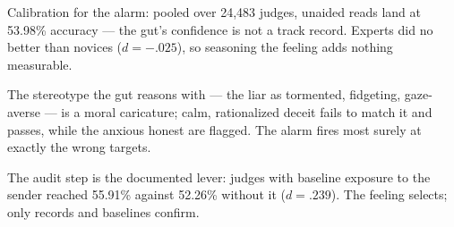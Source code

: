

\begin{distilled}
  \item Calibration for the alarm: pooled over 24,483 judges, unaided reads land at 53.98\% accuracy --- the gut's confidence is not a track record. Experts did no better than novices ($d = -.025$), so seasoning the feeling adds nothing measurable.
  \item The stereotype the gut reasons with --- the liar as tormented, fidgeting, gaze-averse --- is a moral caricature; calm, rationalized deceit fails to match it and passes, while the anxious honest are flagged. The alarm fires most surely at exactly the wrong targets.
  \item The audit step is the documented lever: judges with baseline exposure to the sender reached 55.91\% against 52.26\% without it ($d = .239$). The feeling selects; only records and baselines confirm.
\end{distilled}

